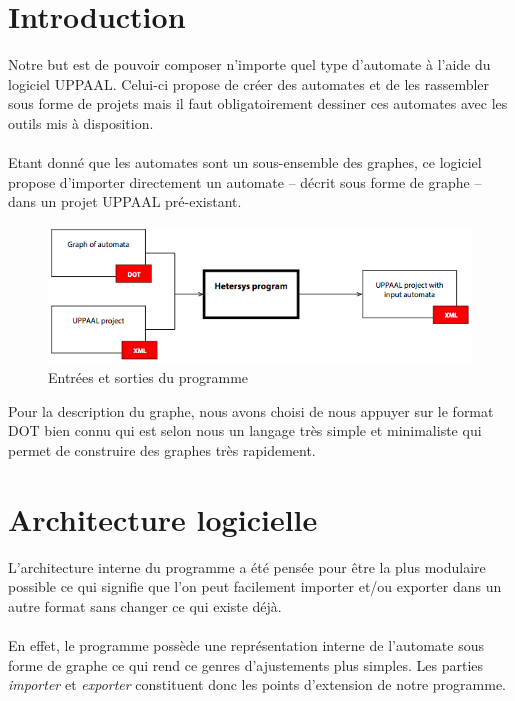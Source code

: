 \documentclass[12pt,a4paper]{report}
\begin{document}
\section{Introduction}

Notre but est de pouvoir composer n'importe quel type d'automate à l'aide du logiciel 
UPPAAL. Celui-ci propose de créer des automates et de les rassembler sous forme de projets 
mais il faut obligatoirement dessiner ces automates avec les outils mis à disposition.
\\\\
Etant donné que les automates sont un sous-ensemble des graphes, ce logiciel propose 
d'importer directement un automate -- décrit sous forme de graphe -- dans un projet 
UPPAAL pré-existant. 

\begin{figure}[h]
  \centering
  \includegraphics[scale=0.7]{ressources/ProgramScheme.png}
  \caption{Entrées et sorties du programme}
\end{figure}

Pour la description du graphe, nous avons choisi de nous appuyer
sur le format DOT bien connu qui est selon nous un langage très simple et minimaliste 
qui permet de construire des graphes très rapidement.

\section{Architecture logicielle}

L'architecture interne du programme a été pensée pour être la plus modulaire possible 
ce qui signifie que l'on peut facilement importer et/ou exporter dans un autre format
sans changer ce qui existe déjà. 
\\\\
En effet, le programme possède une représentation interne de l'automate sous forme 
de graphe ce qui rend ce genres d'ajustements plus simples. Les parties \emph{importer}
et \emph{exporter} constituent donc les points d'extension de notre programme.
\end{document}
